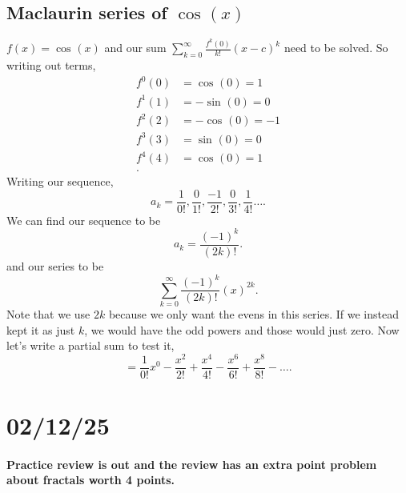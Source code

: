 \subsection*{Maclaurin series of $ \cos^{  } \left( x \right)  $}%
\begin{exampleblock}{}
	 $ f\left( x \right) =\cos^{  } \left( x \right)  $ and our sum $ \sum_{ k=0 } ^{ \infty } \frac{ f^{ k }\left( 0 \right)  }{ k! }\left( x-c \right) ^{ k } $ need to be solved. So writing out terms,
	 \begin{align*}
			f^{ 0 }\left( 0 \right) &= \cos^{  } \left( 0 \right) =1 \\
			f^{ 1 }\left( 1 \right) &= -\sin^{  } \left( 0 \right) =0 \\
			f^{ 2 }\left( 2 \right) &= -\cos^{  } \left( 0 \right) =-1 \\
			f^{ 3 }\left( 3 \right) &= \sin^{  } \left( 0 \right) =0 \\
			f^{ 4 }\left( 4 \right) &= \cos^{  } \left( 0 \right) =1 \\
	 .\end{align*}
	 Writing our sequence,
	 \[
		a_k=\frac{ 1 }{ 0! } ,\frac{ 0 }{ 1! } ,\frac{ -1 }{ 2! } ,\frac{ 0 }{ 3! } ,\frac{ 1 }{ 4! }\ldots
	 .\] 
	 We can find our sequence to be 
	 \[
	 a_k=\frac{ \left( -1 \right) ^{ k } }{ \left( 2k \right) ! }
	 .\] 
	 and our series to be 
	 \[
	 \sum_{ k=0 } ^{ \infty } \frac{ \left( -1 \right) ^{ k } }{ \left( 2k \right) ! }\left( x \right) ^{ 2k }
	 .\] 
		Note that we use $ 2k $ because we only want the evens in this series. If we instead kept it as just $ k $, we would have the odd powers and those would just zero. Now let's write a partial sum to test it,
		\[
		=\frac{ 1 }{ 0! } x^{ 0 }-\frac{ x^2 }{ 2! } + \frac{ x^{ 4 } }{ 4! }-\frac{ x^{ 6 } }{ 6! } + \frac{ x^{ 8 } }{ 8! } - \ldots
		.\] 

\end{exampleblock}
\section*{02/12/25}%
\label{sec:02/12/25}
\paragraph{Practice review is out and the review has an extra point problem about fractals worth 4 points. }

